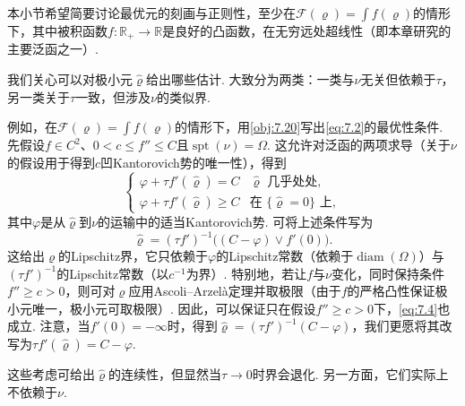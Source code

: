 本小节希望简要讨论最优元的刻画与正则性，至少在$\mathscr F(\varrho)=\int f(\varrho)$的情形下，其中被积函数$f:\mathbb R_+\to\mathbb R$是良好的凸函数，在无穷远处超线性（即本章研究的主要泛函之一）.

我们关心可以对极小元$\widehat\varrho$给出哪些估计. 大致分为两类：一类与$\nu$无关但依赖于$\tau$，另一类关于$\tau$一致，但涉及$\nu$的类似界.

例如，在$\mathscr F(\varrho)=\int f(\varrho)$的情形下，用\autoref{obj:7.20}写出\eqref{eq:7.2}的最优性条件. 先假设$f\in C^2$、$0<c\leq f''\leq C$且$\operatorname{spt}(\nu)=\Omega$. 这允许对泛函的两项求导（关于$\nu$的假设用于得到$c$凹Kantorovich势的唯一性），得到
\begin{equation}\label{eq:7.3}
 \begin{cases}
 \varphi+\tau f'(\widehat\varrho)=C&\widehat\varrho\text{ 几乎处处},\\
 \varphi+\tau f'(\widehat\varrho)\geq C&\text{在 }\{\widehat\varrho=0\}\text{ 上},
 \end{cases}
\end{equation}
其中$\varphi$是从$\widehat\varrho$到$\nu$的运输中的适当Kantorovich势. 可将上述条件写为
\begin{equation}\label{eq:7.4}
 \widehat\varrho=(\tau f')^{-1}\bigl((C-\varphi)\vee f'(0)\bigr).
\end{equation}
这给出$\varrho$的Lipschitz界，它只依赖于$\varphi$的Lipschitz常数（依赖于$\operatorname{diam}(\Omega)$）与$(\tau f')^{-1}$的Lipschitz常数（以$c^{-1}$为界）. 特别地，若让$f$与$\nu$变化，同时保持条件$f''\geq c>0$，则可对$\varrho$应用Ascoli--Arzelà定理并取极限（由于$f$的严格凸性保证极小元唯一，极小元可取极限）. 因此，可以保证只在假设$f''\geq c>0$下，\eqref{eq:7.4}也成立. 注意，当$f'(0)=-\infty$时，得到$\widehat\varrho=(\tau f')^{-1}(C-\varphi)$，我们更愿将其改写为$\tau f'(\widehat\varrho)=C-\varphi$.

这些考虑可给出$\widehat\varrho$的连续性，但显然当$\tau\to0$时界会退化. 另一方面，它们实际上不依赖于$\nu$.

